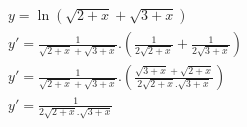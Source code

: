 \begin{ex}
\begin{align}
&y=\ln{(\sqrt{2+x}+\sqrt{3+x})}\nonumber\\
&y'=\frac{1}{\sqrt{2+x}+\sqrt{3+x}}.\left(\frac{1}{2\sqrt{2+x}}+\frac{1}{2\sqrt{3+x}}\right)\nonumber\\
&y'=\frac{1}{\sqrt{2+x}+\sqrt{3+x}}.\left(\frac{\sqrt{3+x}+\sqrt{2+x}}{2\sqrt{2+x}.\sqrt{3+x}}\right)\nonumber\\
&y'=\frac{1}{2\sqrt{2+x}.\sqrt{3+x}}\nonumber
\end{align}
\end{ex}